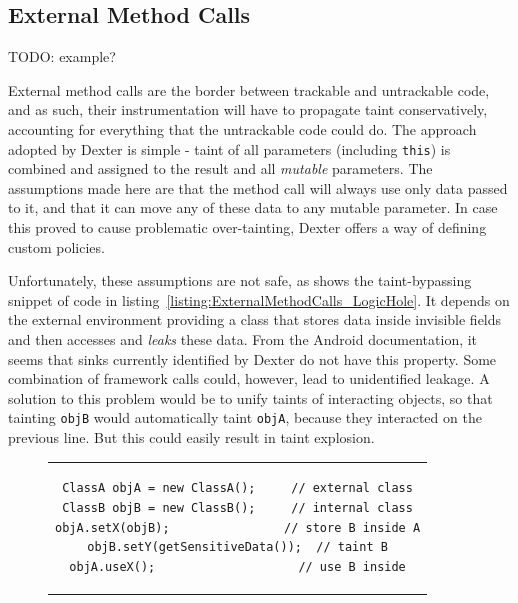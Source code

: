 \documentclass[12pt,twoside,notitlepage]{report}
\begin{document}
\subsection{External Method Calls}
\label{section:TaintPropagation_MethodCalls_External}

TODO: example?

External method calls are the border between trackable and untrackable code, and as such, their instrumentation will have to propagate taint conservatively, accounting for everything that the untrackable code could do. The approach adopted by Dexter is simple - taint of all parameters (including \verb$this$) is combined and assigned to the result and all \emph{mutable} parameters. The assumptions made here are that the method call will always use only data passed to it, and that it can move any of these data to any mutable parameter. In case this proved to cause problematic over-tainting, Dexter offers a way of defining custom policies.

Unfortunately, these assumptions are not safe, as shows the taint-bypassing snippet of code in listing~\ref{listing:ExternalMethodCalls_LogicHole}. It depends on the external environment providing a class that stores data inside invisible fields and then accesses and \emph{leaks} these data. From the Android documentation, it seems that sinks currently identified by Dexter do not have this property. Some combination of framework calls could, however, lead to unidentified leakage. A solution to this problem would be to unify taints of interacting objects, so that tainting \verb$objB$ would automatically taint \verb$objA$, because they interacted on the previous line. But this could easily result in taint explosion.

\begin{figure}[h]
	\centering
	\begin{tabular}{c}
	\begin{lstlisting}
ClassA objA = new ClassA();     // external class
ClassB objB = new ClassB();     // internal class
objA.setX(objB);                // store B inside A
objB.setY(getSensitiveData());  // taint B
objA.useX();                    // use B inside
	\end{lstlisting}
	\end{tabular}
	\begin{lstlisting}[caption={Example of a propagation logic hole},
	                   label={listing:ExternalMethodCalls_LogicHole}]
	\end{lstlisting}
\end{figure}
\end{document}
